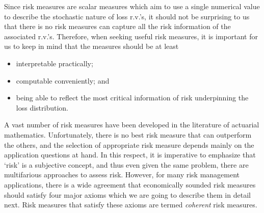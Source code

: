 \documentclass[12pt]{article}
\begin{document}
Since risk measures are scalar measures which aim to use a single numerical value to describe the stochastic nature of loss r.v.'s, it should not be surprising to us that there is no risk measures can capture all the risk information of the associated r.v.'s.  Therefore, when seeking useful risk measures, it is important for us to keep in mind that the measures should be at least
\begin{itemize}
  \item interpretable practically;
  \item computable conveniently; and
  \item being able to reflect the most critical information of risk underpinning the loss distribution.
\end{itemize}

A vast number of risk measures have been developed in the literature of actuarial mathematics. Unfortunately, there is no best risk measure that can outperform the others, and the selection of appropriate risk measure depends mainly on the application questions at hand.  In this respect, it is imperative to emphasize that `risk' is a subjective concept, and thus even given the same problem, there are multifarious approaches to assess risk.  However, for many risk management applications, there is a wide agreement that economically sounded risk measures should satisfy four major axioms which we are going to describe them in detail next.  Risk measures that satisfy these axioms are termed \textit{coherent} risk measures.
\end{document}

